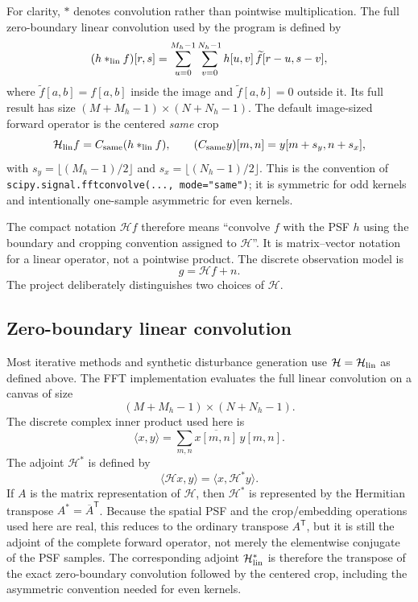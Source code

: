 \documentclass[10pt,a4paper]{article}
\newcommand{\code}[1]{\texttt{#1}}
\begin{document}
For clarity, $*$ denotes convolution rather than pointwise multiplication. The full zero-boundary linear convolution used by the program is defined by
\[
(h*_{\rm lin} f)[r,s]
=\sum_{u=0}^{M_h-1}\sum_{v=0}^{N_h-1}
 h[u,v] \,\widetilde f[r-u,s-v],
\]
where $\widetilde f[a,b]=f[a,b]$ inside the image and $\widetilde f[a,b]=0$ outside it. Its full result has size $(M+M_h-1)\times(N+N_h-1)$. The default image-sized forward operator is the centered \emph{same} crop
\[
\mathcal H_{\rm lin}f=C_{\rm same}(h*_{\rm lin}f),\qquad
(C_{\rm same}y)[m,n]=y[m+s_y,n+s_x],
\]
with $s_y=\lfloor(M_h-1)/2\rfloor$ and $s_x=\lfloor(N_h-1)/2\rfloor$. This is the convention of \code{scipy.signal.fftconvolve(..., mode="same")}; it is symmetric for odd kernels and intentionally one-sample asymmetric for even kernels.

The compact notation $\mathcal H f$ therefore means ``convolve $f$ with the PSF $h$ using the boundary and cropping convention assigned to $\mathcal H$''. It is matrix--vector notation for a linear operator, not a pointwise product. The discrete observation model is
\begin{equation}g=\mathcal{H}f+n.\end{equation}
The project deliberately distinguishes two choices of $\mathcal H$.

\subsection{Zero-boundary linear convolution}
Most iterative methods and synthetic disturbance generation use $\mathcal H=\mathcal H_{\rm lin}$ as defined above. The FFT implementation evaluates the full linear convolution on a canvas of size
\begin{equation}(M+M_h-1)\times(N+N_h-1).\end{equation}
The discrete complex inner product used here is
\[
\langle x,y\rangle=\sum_{m,n}\overline{x[m,n]}\,y[m,n].
\]
The adjoint $\mathcal{H}^{*}$ is defined by
\[
\langle\mathcal{H}x,y\rangle=\langle x,\mathcal{H}^{*}y\rangle.
\]
If $A$ is the matrix representation of $\mathcal H$, then $\mathcal H^{*}$ is represented by the Hermitian transpose $A^{*}=\overline{A}^{\mathsf T}$. Because the spatial PSF and the crop/embedding operations used here are real, this reduces to the ordinary transpose $A^{\mathsf T}$, but it is still the adjoint of the complete forward operator, not merely the elementwise conjugate of the PSF samples. The corresponding adjoint $\mathcal{H}_{\rm lin}^{*}$ is therefore the transpose of the exact zero-boundary convolution followed by the centered crop, including the asymmetric convention needed for even kernels.
\end{document}
